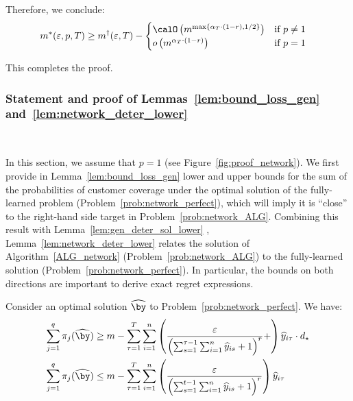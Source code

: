 \documentclass[blindrev]{informs3noheader}
\begin{document}
Therefore, we conclude:
\begin{align*}
m^*(\varepsilon, p,T)
&\geq m^\dagger (\varepsilon, T)- \begin{cases}
    \calO\left(m^{\max\{\alpha_T\cdot (1-r),1/2\}}\right) & \text{if }p \neq 1\\
     o\left(m^{\alpha_T\cdot(1-r)}\right) & \text{if }p = 1
\end{cases} 
\end{align*}

This completes the proof.
\hfill\Halmos

\subsubsection*{Statement and proof of Lemmas~\ref{lem:bound_loss_gen}~ and~\ref{lem:network_deter_lower}}\

In this section, we assume that $p=1$ (see Figure~\ref{fig:proof_network}). We first provide in Lemma~\ref{lem:bound_loss_gen} lower and upper bounds for the sum of the probabilities of customer coverage under the optimal solution of the fully-learned problem (Problem~\eqref{prob:network_perfect}), which will imply it is ``close'' to the right-hand side target in Problem~\eqref{prob:network_ALG}. Combining this result with Lemma~\ref{lem:gen_deter_sol_lower} , Lemma~\ref{lem:network_deter_lower} relates the solution of Algorithm~\ref{ALG_network} (Problem~\eqref{prob:network_ALG}) to the fully-learned solution (Problem~\eqref{prob:network_perfect}). In particular, the bounds on both directions are important to derive exact regret expressions.

\begin{lemma}\label{lem:bound_loss_gen}
Consider an optimal solution $\widehat{\by}$ to Problem~\eqref{prob:network_perfect}. We have:
\begin{align*}
\sum_{j=1}^q\pi_{j}(\widehat{\by})&\geq m-\sum_{\tau=1}^T \sum_{i =1}^n \left(\frac{\varepsilon}{\left(\sum_{s=1}^{\tau-1}\sum_{i=1}^n \widehat{y}_{is}+1\right)^r}+\right)\widehat{y}_{i\tau}\cdot d_\star\\
\sum_{j=1}^q\pi_{j}(\widehat{\by})&\leq m-\sum_{\tau=1}^T\sum_{i=1}^n\left(\frac{\varepsilon}{\left(\sum_{s=1}^{t-1}\sum_{i=1}^n \widehat{y}_{is}+1\right)^r}\right)\widehat{y}_{i\tau}
\end{align*}
\end{lemma}

\end{document}
